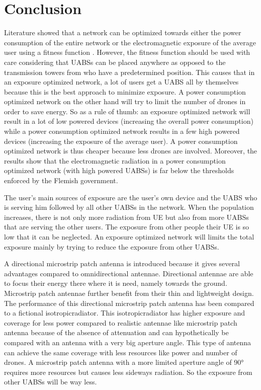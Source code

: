 \documentclass[twocolumn]{phdsymp} %
\begin{document}
\section{Conclusion}
Literature showed that a network can be optimized towards either the power consumption of the entire network 
or the electromagnetic exposure of the average user using a fitness function \cite{J1}.
However, the fitness function should be used with care considering that \gls{UABS}s can be placed anywhere as opposed to 
the transmission towers from \cite{J1} who have a predetermined position. This causes that in an exposure optimized network, 
a lot of users get a \gls{UABS}
all by themselves because this is the best approach to minimize exposure.
A power consumption optimized network on the other hand will try to limit the number of drones 
in order to save energy. 
So as a rule of thumb: an exposure optimized network will result in a lot of low powered devices (increasing the overall power consumption)
while a power consumption optimized network results in a few high powered devices (increasing the exposure of the average user).
A power consumption optimized network is thus cheaper because less drones are involved. 
Moreover, the results show that the electromagnetic radiation in a power consumption optimized network (with high powered \gls{UABS}s)
is far below the thresholds enforced by the Flemish government.

The user's main sources of exposure are the user's own device and the \gls{UABS} who is serving him followed by all
other \gls{UABS}s in the network. 
When the population increases, there is not only more radiation from \gls{UE} but also 
from more \gls{UABS}s that are serving the other users.
The exposure from other people their \gls{UE} is so low that it can be neglected.
An exposure optimized network will limits the total exposure mainly by trying to reduce the exposure from other \gls{UABS}s.

A directional microstrip patch antenna is introduced because it gives several advantages compared to omnidirectional antennae.
Directional antennae are able to focus their energy there where it is need, namely towards the ground. Microstrip patch antennae 
further benefit from their thin and lightweight design. The performance 
of this directional microstrip patch antenna has been compared to a 
fictional \gls{isotropicradiator}.
This \gls{isotropicradiator} has higher exposure and coverage for less power compared to realistic antennae like microstrip patch antenna
because of the absence of attenuation and can hypothetically be compared with an antenna with a very big aperture angle.
This type of antenna can achieve the same coverage with less
resources like power and number of drones. 
A microstrip patch antenna  with a more limited aperture angle of \ang{90} requires more resources but 
causes less sideways radiation. So the exposure from other \gls{UABS}s will be way less.
\end{document}
